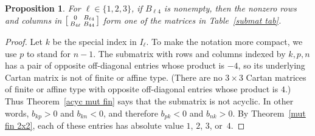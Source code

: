 \documentclass[10pt]{article}
\newtheorem{proposition}{Proposition}[section]
\theoremstyle{definition}
\theoremstyle{remark}
\numberwithin{equation}{section}
\newcommand{\set}[1]{{\lbrace #1 \rbrace}}
\newcommand{\0}{{\mathbf{0}}}
\begin{document}
\begin{proposition}\label{3x3 submat}
For $\ell\in\set{1,2,3}$, if $B_{\ell4}$ is nonempty, then the nonzero rows and columns in $\begin{bsmallmatrix} 0 & B_{\ell4} \\ B_{4\ell} & B_{44} \end{bsmallmatrix}$ form one of the matrices in Table~\ref{submat tab}.
\end{proposition}
\begin{proof}
Let $k$ be the special index in $I_\ell$.
To make the notation more compact, we use $p$ to stand for $n-1$.
The submatrix with rows and columns indexed by $k,p,n$ has a pair of opposite off-diagonal entries whose product is $-4$, so its underlying Cartan matrix is not of finite or affine type.
(There are no $3\times3$ Cartan matrices of finite or affine type with opposite off-diagonal entries whose product is $4$.)
Thus Theorem~\ref{acyc mut fin} says that the submatrix is not acyclic.
In other words, $b_{kp}>0$ and $b_{kn}<0$, and therefore $b_{pk}<0$ and $b_{nk}>0$.
By Theorem~\ref{mut fin 2x2}, each of these entries has absolute value $1$, $2$, $3$, or~$4$.


\end{proof}
\end{document}
